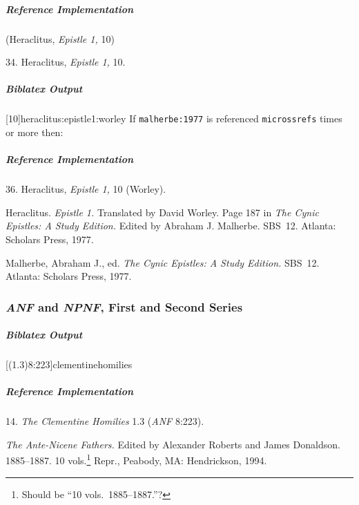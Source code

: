 \documentclass[a4paper]{article}
\newenvironment{biboutput}{%
  \subparagraph{Biblatex Output}
}{\color{black}}
\newenvironment{refimp}{%
  \subparagraph{Reference Implementation}
  \color{reference-colour}
  \rm
}{\par\color{black}}
\begin{document}
\begin{refimp}
  (Heraclitus, \emph{Epistle 1,} 10)

  \hspace*{\bibindent}34. Heraclitus, \emph{Epistle 1,} 10.
\end{refimp}

\begin{biboutput}
  [10]{heraclitus:epistle1:worley}
  If \texttt{malherbe:1977} is referenced \texttt{microssrefs} times or more
  then:\par
\end{biboutput}

\begin{refimp}
  \hspace*{\bibindent}36. Heraclitus, \emph{Epistle 1,} 10 (Worley).

  \hangindent\bibindent Heraclitus. \emph{Epistle 1.} Translated by David
  Worley. Page 187 in \emph{The Cynic Epistles: A Study Edition.} Edited by
  Abraham J. Malherbe. SBS~12. Atlanta: Scholars Press, 1977.

  \hangindent\bibindent Malherbe, Abraham J., ed. \emph{The Cynic Epistles: A
  Study Edition.} SBS~12. Atlanta: Scholars Press, 1977.

\end{refimp}

\subsubsection{\emph{ANF} and \emph{NPNF}, First and Second Series}

\begin{biboutput}
  [(1.3)8:223]{clementinehomilies}
\end{biboutput}

\begin{refimp}
  \hspace*{\bibindent}14. \emph{The Clementine Homilies} 1.3 (\emph{ANF}
  8:223).

  \hangindent\bibindent \emph{The Ante-Nicene Fathers.} Edited by Alexander
  Roberts and James Donaldson. 1885–1887. 10 vols.\footnote{Should be “10
  vols.\ 1885–1887.”?} Repr., Peabody, MA:
  Hendrickson, 1994.

\end{refimp}
\end{document}
